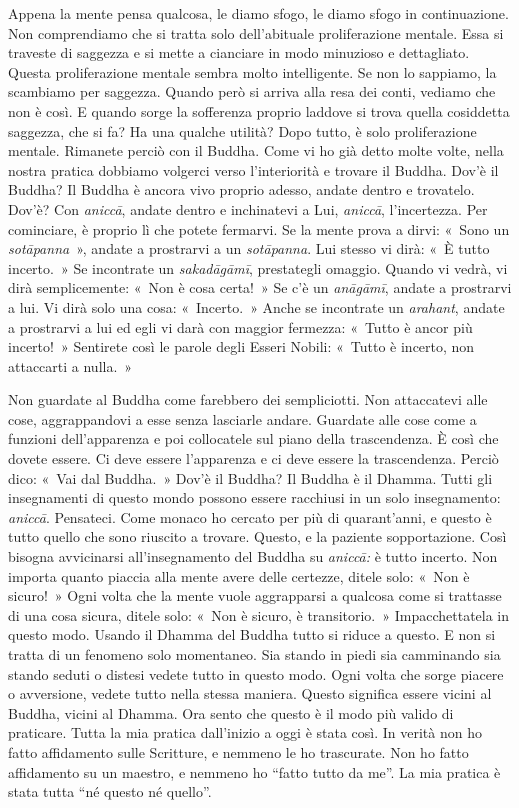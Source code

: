 Appena la mente pensa qualcosa, le diamo sfogo, le diamo sfogo in
continuazione. Non comprendiamo che si tratta solo dell'abituale
proliferazione mentale. Essa si traveste di saggezza e si mette a
cianciare in modo minuzioso e dettagliato. Questa proliferazione mentale
sembra molto intelligente. Se non lo sappiamo, la scambiamo per
saggezza. Quando però si arriva alla resa dei conti, vediamo che non è
così. E quando sorge la sofferenza proprio laddove si trova quella
cosiddetta saggezza, che si fa? Ha una qualche utilità? Dopo tutto, è
solo proliferazione mentale. Rimanete perciò con il Buddha. Come vi ho
già detto molte volte, nella nostra pratica dobbiamo volgerci verso
l'interiorità e trovare il Buddha. Dov'è il Buddha? Il Buddha è ancora
vivo proprio adesso, andate dentro e trovatelo. Dov'è? Con
\emph{aniccā}, andate dentro e inchinatevi a Lui, \emph{aniccā},
l'incertezza. Per cominciare, è proprio lì che potete fermarvi. Se la
mente prova a dirvi: «~Sono un \emph{sotāpanna}~», andate a prostrarvi a
un \emph{sotāpanna}. Lui stesso vi dirà: «~È tutto incerto.~» Se
incontrate un \emph{sakadāgāmī}, prestategli omaggio. Quando vi vedrà,
vi dirà semplicemente: «~Non è cosa certa!~» Se c'è un \emph{anāgāmī},
andate a prostrarvi a lui. Vi dirà solo una cosa: «~Incerto.~» Anche se
incontrate un \emph{arahant}, andate a prostrarvi a lui ed egli vi darà
con maggior fermezza: «~Tutto è ancor più incerto!~» Sentirete così le
parole degli Esseri Nobili: «~Tutto è incerto, non attaccarti a nulla.~»

Non guardate al Buddha come farebbero dei sempliciotti. Non attaccatevi
alle cose, aggrappandovi a esse senza lasciarle andare. Guardate alle
cose come a funzioni dell'apparenza e poi collocatele sul piano della
trascendenza. È così che dovete essere. Ci deve essere l'apparenza e ci
deve essere la trascendenza. Perciò dico: «~Vai dal Buddha.~» Dov'è il
Buddha? Il Buddha è il Dhamma. Tutti gli insegnamenti di questo mondo
possono essere racchiusi in un solo insegnamento: \emph{aniccā}.
Pensateci. Come monaco ho cercato per più di quarant'anni, e questo è
tutto quello che sono riuscito a trovare. Questo, e la paziente
sopportazione. Così bisogna avvicinarsi all'insegnamento del Buddha su
\emph{aniccā:} è tutto incerto. Non importa quanto piaccia alla mente
avere delle certezze, ditele solo: «~Non è sicuro!~» Ogni volta che la
mente vuole aggrapparsi a qualcosa come si trattasse di una cosa sicura,
ditele solo: «~Non è sicuro, è transitorio.~» Impacchettatela in questo
modo. Usando il Dhamma del Buddha tutto si riduce a questo. E non si
tratta di un fenomeno solo momentaneo. Sia stando in piedi sia
camminando sia stando seduti o distesi vedete tutto in questo modo. Ogni
volta che sorge piacere o avversione, vedete tutto nella stessa maniera.
Questo significa essere vicini al Buddha, vicini al Dhamma. Ora sento
che questo è il modo più valido di praticare. Tutta la mia pratica
dall'inizio a oggi è stata così. In verità non ho fatto affidamento
sulle Scritture, e nemmeno le ho trascurate. Non ho fatto affidamento su
un maestro, e nemmeno ho ``fatto tutto da me''. La mia pratica è stata
tutta ``né questo né quello''.

